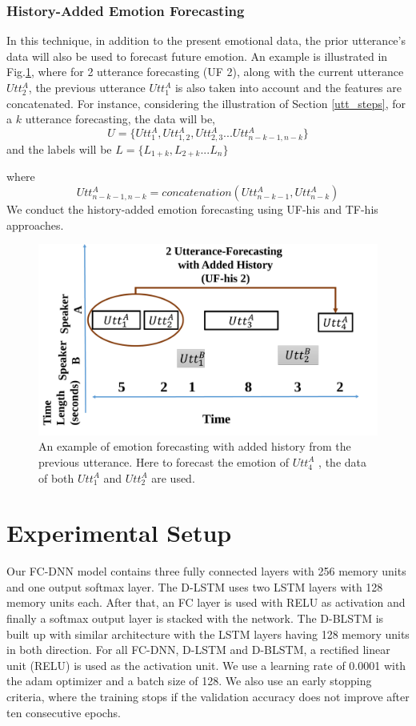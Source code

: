 \subsubsection{History-Added Emotion Forecasting}
\label{history}
In this technique, in addition to the present emotional data, the prior utterance's data will also be used to forecast future emotion. An example is illustrated in Fig.\ref{fig:history}, where for 2 utterance forecasting (UF 2), along with the current utterance $Utt_{2}^A$, the previous utterance $Utt_{1}^A$ is also taken into account and the features are concatenated. For instance, considering the illustration of Section \ref{utt_steps}, for a $k$ utterance forecasting, the data will be,
\[
U=\{Utt_{1}^A, Utt_{1,2}^A, Utt_{2,3}^A...Utt_{n-k-1,n-k}^A\}
\]
and the labels will be
$L=\{L_{1+k},L_{2+k}...L_n\}$

where \[Utt_{n-k-1,n-k}^A=concatenation(Utt_{n-k-1}^A, Utt_{n-k}^A)\]
We conduct the history-added emotion forecasting using UF-his and TF-his approaches.
\begin{figure}
\centering
\includegraphics[width=.6\linewidth]{Chapters/his.pdf}
\caption[Two numerical solutions]{An example of emotion forecasting with added history from the previous utterance. Here to forecast the emotion of $Utt_{4}^A$ , the data of both $Utt_{1}^A$ and $Utt_{2}^A$  are used.  }
\label{fig:history}
\end{figure}

 \section{Experimental Setup }
Our FC-DNN model contains three fully connected layers with 256 memory units and one output softmax layer.  The D-LSTM uses two LSTM layers with 128 memory units each. After that, an FC layer is used with RELU as activation and finally a softmax output layer is stacked with the network. The D-BLSTM is built up with similar architecture with the LSTM layers having 128 memory units in both direction.   For all FC-DNN, D-LSTM and D-BLSTM, a rectified linear unit (RELU) is used as the activation unit. We use a learning rate of 0.0001 with the adam \cite{adam} optimizer and a batch size of 128. We also use an early stopping criteria, where the training stops if the validation accuracy does not improve after ten consecutive epochs. 

